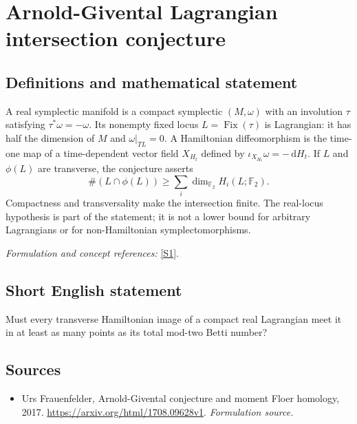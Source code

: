 \documentclass[11pt]{article}
\begin{document}
\section*{\texorpdfstring{Arnold-Givental Lagrangian intersection conjecture}{Arnold-Givental Lagrangian intersection conjecture}}\label{30006902}
\subsection{Definitions and mathematical statement}
A real symplectic manifold is a compact symplectic $(M,\omega)$ with an involution $\tau$ satisfying $\tau^*\omega=-\omega$. Its nonempty fixed locus $L=\operatorname{Fix}(\tau)$ is Lagrangian: it has half the dimension of $M$ and $\omega|_{TL}=0$. A Hamiltonian diffeomorphism is the time-one map of a time-dependent vector field $X_{H_t}$ defined by $\iota_{X_{H_t}}\omega=-{\,\mathrm{d}} H_t$. If $L$ and $\phi(L)$ are transverse, the conjecture asserts
\[
 \#(L\cap\phi(L))\ge\sum_i\dim_{{\mathbb{F}}_2}H_i(L;{\mathbb{F}}_2).
\]
Compactness and transversality make the intersection finite. The real-locus hypothesis is part of the statement; it is not a lower bound for arbitrary Lagrangians or for non-Hamiltonian symplectomorphisms.
\par\smallskip\textit{Formulation and concept references:} \href{https://arxiv.org/html/1708.09628v1}{[S1]}.

\subsection{Short English statement}
Must every transverse Hamiltonian image of a compact real Lagrangian meet it in at least as many points as its total mod-two Betti number?
\subsection{Sources}
\begin{itemize}
\item[S1]Urs Frauenfelder, Arnold-Givental conjecture and moment Floer homology, 2017.
\url{https://arxiv.org/html/1708.09628v1}.
\textit{Formulation source.}
\end{itemize}
\end{document}
